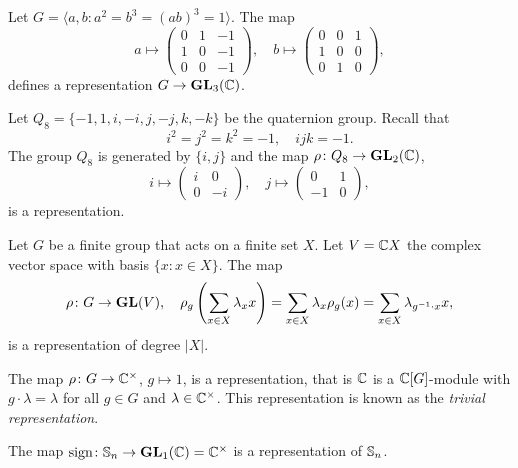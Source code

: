 \begin{example}
  Let $G=\langle a,b:a^2=b^3=(ab)^3=1\rangle$. The map 
  \[
    a\mapsto\begin{pmatrix}
    0 & 1 & -1\\
    1 & 0 & -1\\
    0 & 0 & -1
    \end{pmatrix},
    \quad
    b\mapsto\begin{pmatrix}
      0 & 0 & 1\\
      1 & 0 & 0\\
      0 & 1 & 0
    \end{pmatrix},
  \]
  defines a representation $G\to\mathbf{GL}_3(\mathbb{C})$. 
\end{example}

\begin{example}
    Let $Q_8=\{-1,1,i,-i,j,-j,k,-k\}$ be the quaternion group. Recall that
    \[
    i^2=j^2=k^2=-1,\quad
    ijk=-1.
    \]
    The group $Q_8$ is generated by $\{i,j\}$ 
    and the map $\rho\colon Q_8\to\mathbf{GL}_2(\mathbb{C})$, 
    \[
    i\mapsto\begin{pmatrix}
    i&0\\0&-i
    \end{pmatrix},
    \quad
    j\mapsto\begin{pmatrix}
    0&1\\-1&0
    \end{pmatrix},
    \]
    is a representation.
\end{example}

\begin{example}
  Let $G$ be a finite group that acts on a finite set $X$. 
  Let $V=\mathbb{C} X$ the complex vector space with basis $\{x:x\in
  X\}$. The map 
  \[
	\rho\colon G\to\mathbf{GL}(V),\quad
	\rho_g\left(\sum_{x\in X}\lambda_x x\right)
	=\sum_{x\in X}\lambda_x\rho_g(x)
	=\sum_{x\in X}\lambda_{g^{-1}\cdot x}x, 
  \]
  is a representation of degree $|X|$.
\end{example}

\begin{example}
    The map $\rho\colon G\to\mathbb{C}^{\times}$, $g\mapsto 1$, 
    is a representation, that is $\mathbb{C}$ is a $\mathbb{C}[G]$-module with
    $g\cdot \lambda=\lambda$ for all $g\in G$ 
    and $\lambda\in\mathbb{C}^{\times}$. This representation 
    is known 
    as the \emph{trivial representation}. 
\end{example}

\begin{example}
    The map $\operatorname{sign}\colon\mathbb{S}_n\to\mathbf{GL}_1(\mathbb{C})=\mathbb{C}^{\times}$ is a representation of $\mathbb{S}_n$.
\end{example}

